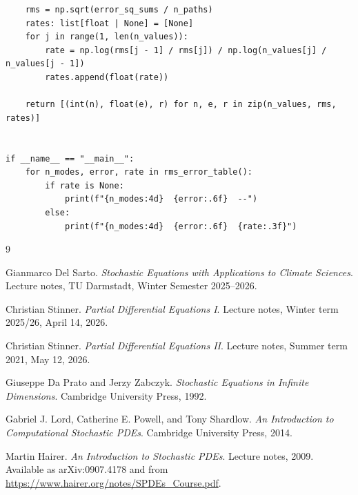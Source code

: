 \documentclass[11pt,a4paper]{article}
\begin{document}
\begin{lstlisting}
    rms = np.sqrt(error_sq_sums / n_paths)
    rates: list[float | None] = [None]
    for j in range(1, len(n_values)):
        rate = np.log(rms[j - 1] / rms[j]) / np.log(n_values[j] / n_values[j - 1])
        rates.append(float(rate))

    return [(int(n), float(e), r) for n, e, r in zip(n_values, rms, rates)]


if __name__ == "__main__":
    for n_modes, error, rate in rms_error_table():
        if rate is None:
            print(f"{n_modes:4d}  {error:.6f}  --")
        else:
            print(f"{n_modes:4d}  {error:.6f}  {rate:.3f}")
\end{lstlisting}

\begin{thebibliography}{9}

Gianmarco Del Sarto.
\emph{Stochastic Equations with Applications to Climate Sciences}.
Lecture notes, TU Darmstadt, Winter Semester 2025--2026.

Christian Stinner.
\emph{Partial Differential Equations I}.
Lecture notes, Winter term 2025/26, April 14, 2026.

Christian Stinner.
\emph{Partial Differential Equations II}.
Lecture notes, Summer term 2021, May 12, 2026.

Giuseppe Da Prato and Jerzy Zabczyk.
\emph{Stochastic Equations in Infinite Dimensions}.
Cambridge University Press, 1992.

Gabriel J. Lord, Catherine E. Powell, and Tony Shardlow.
\emph{An Introduction to Computational Stochastic PDEs}.
Cambridge University Press, 2014.

Martin Hairer.
\emph{An Introduction to Stochastic PDEs}.
Lecture notes, 2009.
Available as arXiv:0907.4178 and from
\url{https://www.hairer.org/notes/SPDEs_Course.pdf}.

\end{thebibliography}
\end{document}

